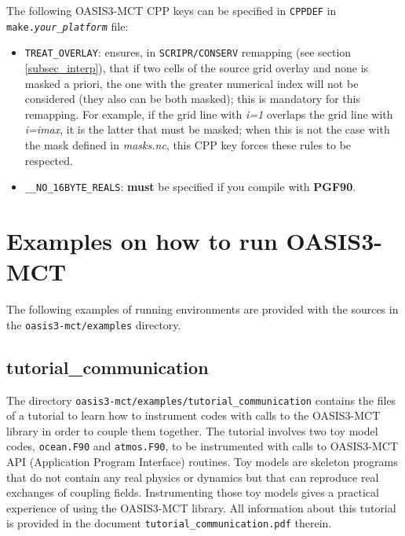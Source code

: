 The following OASIS3-MCT CPP keys can be specified in {\tt CPPDEF} in {\tt make.{\it your\_platform}} file:
\begin{itemize}
\item {\tt TREAT\_OVERLAY}:  ensures, in {\tt SCRIPR/CONSERV}
  remapping (see section \ref{subsec_interp}), that if two cells of
  the source grid overlay and none is masked a priori, the one with the greater numerical
  index will not be considered (they also can be both masked); this is mandatory
  for this remapping. For example, if the grid line with {\it i=1} overlaps
  the grid line with {\it i=imax}, it is the latter that must be masked;
  when this is not the case with the mask defined in {\it masks.nc},
  this CPP key forces these rules to be respected.

\item {\tt \_\_NO\_16BYTE\_REALS}:  {\bf must} be specified  if you compile
with {\bf PGF90}.
\end{itemize}


\section{Examples on how to run OASIS3-MCT}
\label{subsec_running}

The following examples of running environments are provided with the
sources in the {\tt oasis3-mct/examples} directory.

\subsection{tutorial\_communication}
\label{subsec_tutorial}

The directory  {\tt oasis3-mct/examples/tutorial\_communication}
contains the files of a tutorial to learn how to instrument codes
with calls to the OASIS3-MCT library in order to couple them
together. The tutorial involves two toy model codes, {\tt ocean.F90}
and {\tt atmos.F90}, to be instrumented with calls
to OASIS3-MCT API (Application Program Interface) routines. Toy models
are skeleton programs that do not contain any real physics or dynamics
but that can reproduce real exchanges of coupling
fields. Instrumenting those toy models gives a practical experience of
using the OASIS3-MCT library. All information about this tutorial is
provided in the document {\tt tutorial\_communication.pdf} therein. 

